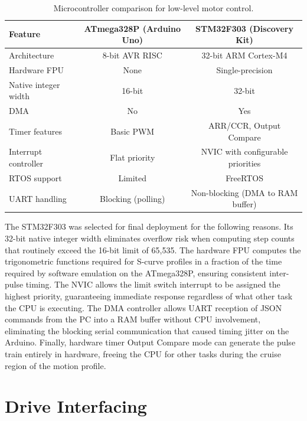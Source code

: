 \begin{table}[H]
    \centering
    \caption{Microcontroller comparison for low-level motor control.}
    \label{tab:mcu_comparison}
    \renewcommand{\arraystretch}{1.2}
    \begin{tabular}{@{}lcc@{}}
        \toprule
        \textbf{Feature} & \textbf{ATmega328P (Arduino Uno)} & \textbf{STM32F303 (Discovery Kit)} \\
        \midrule
        Architecture & 8-bit AVR RISC & 32-bit ARM Cortex-M4 \\
        Hardware FPU & None & Single-precision \\
        Native integer width & 16-bit & 32-bit \\
        DMA & No & Yes \\
        Timer features & Basic PWM & ARR/CCR, Output Compare \\
        Interrupt controller & Flat priority & NVIC with configurable priorities \\
        RTOS support & Limited & FreeRTOS \\
        UART handling & Blocking (polling) & Non-blocking (DMA to RAM buffer) \\
        \bottomrule
    \end{tabular}
\end{table}

The STM32F303 was selected for final deployment for the following reasons. Its 32-bit native integer width eliminates overflow risk when computing step counts that routinely exceed the 16-bit limit of 65,535. The hardware FPU computes the trigonometric functions required for S-curve profiles in a fraction of the time required by software emulation on the ATmega328P, ensuring consistent inter-pulse timing. The NVIC allows the limit switch interrupt to be assigned the highest priority, guaranteeing immediate response regardless of what other task the CPU is executing. The DMA controller allows UART reception of JSON commands from the PC into a RAM buffer without CPU involvement, eliminating the blocking serial communication that caused timing jitter on the Arduino. Finally, hardware timer Output Compare mode can generate the pulse train entirely in hardware, freeing the CPU for other tasks during the cruise region of the motion profile.

\section{Drive Interfacing}


